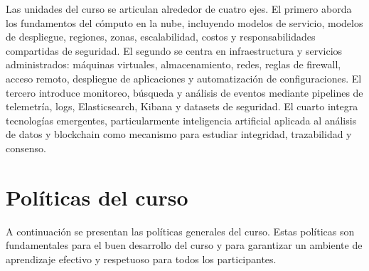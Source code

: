 \documentclass[
  coursetitle={Cómputo Nube y Tecnologías Emergentes},
  coursehours={96},
  coursedate={Verano 2026},
  doctype={Guía del curso},
  otherlangs={english,french},
  authorname={Lázaro},
  authorsurname={Bustio-Martínez},
  authortitle={PhD},
  role={Profesor Investigador},
  email={lbustio@inaoe.mx},
  phone={5559504000},
  ext={7459},
  institution={Instituto Nacional de Astrofísica, Óptica y Electrónica (INAOE)},
  department={Maestría en Ciencias en Tecnologías de Seguridad},
  address={Luis Enrique Erro 1, Sta. Ma. Tonantzintla, San Andrés Cholula, CP 72840, Puebla, México},
  margin={0.5in}
]{lbustio_lecture_notes}
\begin{document}
Las unidades del curso se articulan alrededor de cuatro ejes. El primero aborda los fundamentos del cómputo en la nube, incluyendo modelos de servicio, modelos de despliegue, regiones, zonas, escalabilidad, costos y responsabilidades compartidas de seguridad. El segundo se centra en infraestructura y servicios administrados: máquinas virtuales, almacenamiento, redes, reglas de firewall, acceso remoto, despliegue de aplicaciones y automatización de configuraciones. El tercero introduce monitoreo, búsqueda y análisis de eventos mediante pipelines de telemetría, logs, Elasticsearch, Kibana y datasets de seguridad. El cuarto integra tecnologías emergentes, particularmente inteligencia artificial aplicada al análisis de datos y blockchain como mecanismo para estudiar integridad, trazabilidad y consenso.

\section{Políticas del curso}
\label{sec:politicas}

A continuación se presentan las políticas generales del curso. Estas políticas son fundamentales para el buen desarrollo del curso y para garantizar un ambiente de aprendizaje efectivo y respetuoso para todos los participantes.
\end{document}
